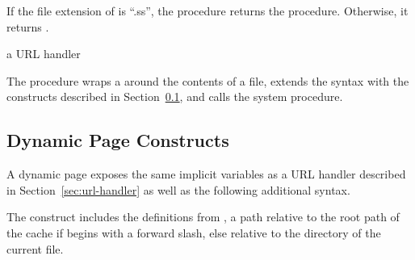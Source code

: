 If the file extension of  is ``.ss'', the
 procedure returns the
 procedure. Otherwise, it returns
.

\begin{procedure}
\end{procedure}
\returns{} a URL handler

The  procedure wraps a
 around the contents of a file, extends the
syntax with the constructs described in
Section~\ref{sec:dynamic-page-constructs}, and calls the 
system procedure.

\subsection {Dynamic Page Constructs}\label{sec:dynamic-page-constructs}

A dynamic page exposes the same implicit variables as a URL handler
described in Section~\ref{sec:url-handler} as well as the following
additional syntax.

\begin{syntax}
\end{syntax}\antipar
{}

\begin{syntax}
\end{syntax}\antipar
{}

\begin{syntax}
\end{syntax}\antipar

The  construct includes the definitions from
, a path relative to the root path of the cache if
 begins with a forward slash, else relative to the
directory of the current file.


